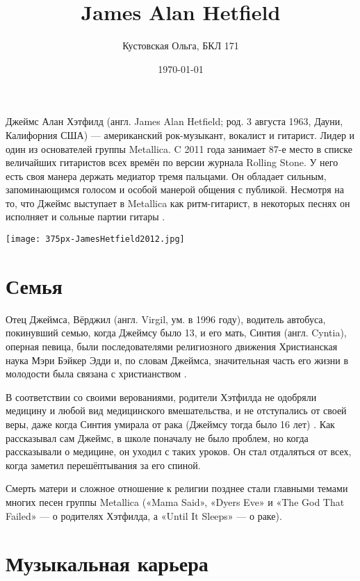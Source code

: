 \documentclass[a4paper,12pt,leqno]{article}
\author{Кустовская Ольга, БКЛ 171}
\title{James Alan Hetfield}
\date{\today}
\theoremstyle{plain} %
\theoremstyle{definition} %
\theoremstyle{remark} %
\begin{document}

\maketitle

\tableofcontents

Джеймс Алан Хэтфилд (англ. James Alan Hetfield; род. 3 августа 1963, Дауни, Калифорния США) — американский рок-музыкант, вокалист и гитарист. Лидер и один из основателей группы Metallica. C 2011 года занимает 87-е место в списке величайших гитаристов всех времён по версии журнала Rolling Stone. У него есть своя манера держать медиатор тремя пальцами. Он обладает сильным, запоминающимся голосом и особой манерой общения с публикой. Несмотря на то, что Джеймс выступает в Metallica как ритм-гитарист, в некоторых песнях он исполняет и сольные партии гитары \cite{[1]}.

\texttt{[image: 375px-JamesHetfield2012.jpg]}

\section{Семья}

Отец Джеймса, Вёрджил (англ. Virgil, ум. в 1996 году), водитель автобуса, покинувший семью, когда Джеймсу было 13, и его мать, Синтия (англ. Cyntia), оперная певица, были последователями религиозного движения Христианская наука Мэри Бэйкер Эдди и, по словам Джеймса, значительная часть его жизни в молодости была связана с христианством \cite{[2]}.

В соответствии со своими верованиями, родители Хэтфилда не одобряли медицину и любой вид медицинского вмешательства, и не отступались от своей веры, даже когда Синтия умирала от рака (Джеймсу тогда было 16 лет) \cite{[3]}. Как рассказывал сам Джеймс, в школе поначалу не было проблем, но когда рассказывали о медицине, он уходил с таких уроков. Он стал отдаляться от всех, когда заметил перешёптывания за его спиной.
 
Смерть матери и сложное отношение к религии позднее стали главными темами многих песен группы Metallica («Mama Said», «Dyers Eve» и «The God That Failed» — о родителях Хэтфилда, а «Until It Sleeps» — о раке).

\section{Музыкальная карьера}
\end{document}
